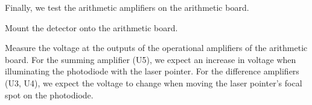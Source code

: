 Finally, we test the arithmetic amplifiers on the arithmetic board.
\begin{todolist}
	\item Mount the detector onto the arithmetic board.
	\item Measure the voltage at the outputs of the operational amplifiers of the arithmetic board. For the summing amplifier (U5), we expect an increase in voltage when illuminating the photodiode with the laser pointer.
For the difference amplifiers (U3, U4), we expect the voltage to change when moving the laser pointer's focal spot on the photodiode.
\end{todolist}
